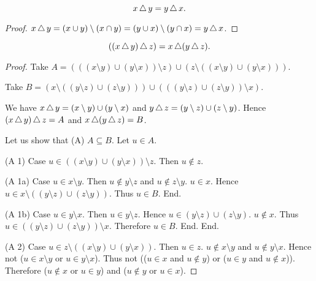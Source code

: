 \documentclass[../../sets-and-functions.ftl.tex]{subfiles}
\begin{document}
  \begin{forthel}
    \begin{proposition}[SF 01 04 688675]
      \[ x \mathop{\triangle} y = y \mathop{\triangle} x. \]
    \end{proposition}
    \begin{proof}
      $x \mathop{\triangle} y
      = (x \cup y) \setminus (x \cap y)
      = (y \cup x) \setminus (y \cap x)
      = y \mathop{\triangle} x$.
    \end{proof}


    \begin{proposition}[SF 01 04 606646]
      \[ ((x \mathop{\triangle} y) \mathop{\triangle} z) = x \mathop{\triangle} (y \mathop{\triangle} z). \]
    \end{proposition}
    \begin{proof}
      Take $A = (((x \setminus y) \cup (y \setminus x)) \setminus z) \cup (z \setminus ((x \setminus y) \cup (y \setminus x)))$.

      Take $B = (x \setminus ((y \setminus z) \cup (z \setminus y))) \cup (((y \setminus z) \cup (z \setminus y)) \setminus x)$.

      We have $x \mathop{\triangle} y = (x \setminus y) \cup (y \setminus x)$ and $y \mathop{\triangle} z = (y \setminus z) \cup (z \setminus y)$.
      Hence $(x \mathop{\triangle} y) \mathop{\triangle} z = A$ and $x \mathop{\triangle} (y \mathop{\triangle} z) = B$.

      Let us show that (A) $A \subseteq B$.
        Let $u \in A$.

        (A 1) Case $u \in ((x \setminus y) \cup (y \setminus x)) \setminus z$.
          Then $u \notin z$.

          (A 1a) Case $u \in x \setminus y$.
            Then $u \notin y \setminus z$ and $u \notin z \setminus y$.
            $u \in x$.
            Hence $u \in x \setminus ((y \setminus z) \cup (z \setminus y))$.
            Thus $u \in B$.
          End.

          (A 1b) Case $u \in y \setminus x$.
            Then $u \in y \setminus z$.
            Hence $u \in (y \setminus z) \cup (z \setminus y)$.
            $u \notin x$.
            Thus $u \in ((y \setminus z) \cup (z \setminus y)) \setminus x$.
            Therefore $u \in B$.
          End.
        End.

        (A 2) Case $u \in z \setminus ((x \setminus y) \cup (y \setminus x))$.
          Then $u \in z$. $u \notin x \setminus y$ and $u \notin y \setminus x$.
          Hence not ($u \in x \setminus y$ or $u \in y \setminus x$).
          Thus not (($u \in x$ and $u \notin y$) or ($u \in y$ and
          $u \notin x$)).
          Therefore ($u \notin x$ or $u \in y$) and ($u \notin y$ or $u \in x$).


\end{proof}
\end{forthel}
\end{document}

